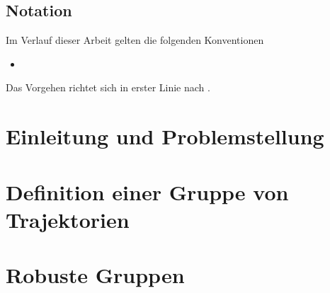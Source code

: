 




\tableofcontents

\section*{Notation}
Im Verlauf dieser Arbeit gelten die folgenden Konventionen
\begin{itemize}
	\item 
\end{itemize}
Das Vorgehen richtet sich in erster Linie nach \textcite{buchin2015}.
\cleardoubleoddemptypage
{}
\setcounter{page}{1}
\setcounter{footnote}{0}

\chapter{Einleitung und Problemstellung} %
\label{cha:einleitung}


\chapter{Definition einer Gruppe von Trajektorien} %
\label{cha:def_gruppe}



\chapter{Robuste Gruppen} %
\label{cha:robust}







\cleardoubleoddemptypage
{}
\setcounter{page}{1}
\appendix
\printindex
\listoffigures
\printbibliography
\todototoc
{}
